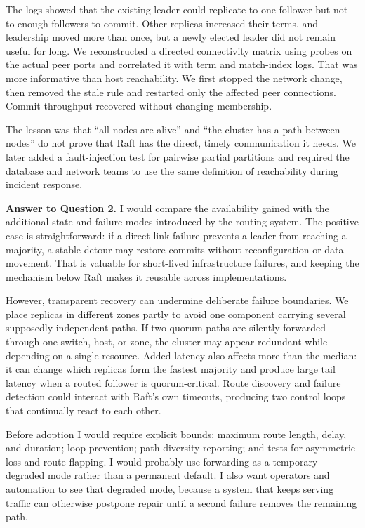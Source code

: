 \documentclass[11pt,a4paper]{article}
\begin{document}
The logs showed that the existing leader could replicate to one follower but not to enough followers to commit. Other replicas increased their terms, and leadership moved more than once, but a newly elected leader did not remain useful for long. We reconstructed a directed connectivity matrix using probes on the actual peer ports and correlated it with term and match-index logs. That was more informative than host reachability. We first stopped the network change, then removed the stale rule and restarted only the affected peer connections. Commit throughput recovered without changing membership.

The lesson was that ``all nodes are alive'' and ``the cluster has a path between nodes'' do not prove that Raft has the direct, timely communication it needs. We later added a fault-injection test for pairwise partial partitions and required the database and network teams to use the same definition of reachability during incident response.

\textbf{Answer to Question 2.}
I would compare the availability gained with the additional state and failure modes introduced by the routing system. The positive case is straightforward: if a direct link failure prevents a leader from reaching a majority, a stable detour may restore commits without reconfiguration or data movement. That is valuable for short-lived infrastructure failures, and keeping the mechanism below Raft makes it reusable across implementations.

However, transparent recovery can undermine deliberate failure boundaries. We place replicas in different zones partly to avoid one component carrying several supposedly independent paths. If two quorum paths are silently forwarded through one switch, host, or zone, the cluster may appear redundant while depending on a single resource. Added latency also affects more than the median: it can change which replicas form the fastest majority and produce large tail latency when a routed follower is quorum-critical. Route discovery and failure detection could interact with Raft's own timeouts, producing two control loops that continually react to each other.

Before adoption I would require explicit bounds: maximum route length, delay, and duration; loop prevention; path-diversity reporting; and tests for asymmetric loss and route flapping. I would probably use forwarding as a temporary degraded mode rather than a permanent default. I also want operators and automation to see that degraded mode, because a system that keeps serving traffic can otherwise postpone repair until a second failure removes the remaining path.
\end{document}
